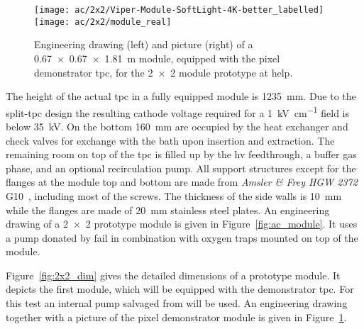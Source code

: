 \begin{figure}[tbp]
	\centering
	\texttt{[image: ac/2x2/Viper-Module-SoftLight-4K-better\_labelled]}
	\texttt{[image: ac/2x2/module\_real]}
	\caption[\AC{} \num{2 x 2} prototype module]{%
		Engineering drawing (left) and picture (right) of a \SI{0.67 x 0.67 x 1.81}{\metre} module, equipped with the pixel demonstrator \acrshort{tpc}, for the \num{2 x 2} module \AC{} prototype at \acrshort{help}.
	}
	\label{fig:2x2_mod}
\end{figure}

The height of the actual \gls{tpc} in a fully equipped module is \SI{1235}{\milli\metre}.
Due to the split-\gls{tpc} design the resulting cathode voltage required for a \SI{1}{\kilo\volt\per\centi\metre} field is below \SI{35}{\kilo\volt}.
On the bottom \SI{160}{\milli\metre} are occupied by the heat exchanger and check valves for \lar{} exchange with the bath upon insertion and extraction.
The remaining room on top of the \gls{tpc} is filled up by the \gls{hv} feedthrough, a buffer gas phase, and an optional recirculation pump.
All support structures except for the flanges at the module top and bottom are made from \emph{Amsler \& Frey HGW 2372} G10~\cite{g10}, including most of the screws.
The thickness of the side walls is \SI{10}{\milli\metre} while the flanges are made of \SI{20}{\milli\metre} stainless steel plates.
An engineering drawing of a \num{2 x 2} prototype module is given in Figure~\ref{fig:ac_module}.
It uses a \lar{} pump donated by \gls{fail} in combination with oxygen traps mounted on top of the module.

Figure~\ref{fig:2x2_dim} gives the detailed dimensions of a prototype module.
It depicts the first module, which will be equipped with the demonstrator \gls{tpc}.
For this test an internal pump salvaged from \AT{} will be used.
An engineering drawing together with a picture of the pixel demonstrator module is given in Figure~\ref{fig:2x2_mod}.

